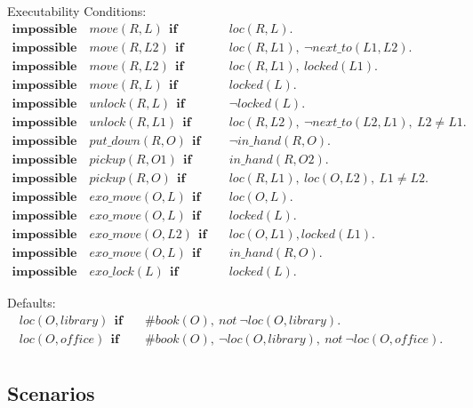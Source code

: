 \documentclass[11pt, oneside]{article}
\begin{document}
Executability Conditions:
\begin{align*}
  \mathbf{impossible}\quad move(R, L)~~\mathbf{if}&\quad loc(R,L).\\
  \mathbf{impossible}\quad move(R, L2)~~\mathbf{if}&\quad loc(R,L1),~\neg next\_to(L1,L2).\\
  \mathbf{impossible}\quad move(R,L2)~~\mathbf{if}&\quad loc(R,L1),~locked(L1).\\
  \mathbf{impossible}\quad move(R,L)~~\mathbf{if}&\quad locked(L).\\
  \mathbf{impossible}\quad unlock(R, L)~~\mathbf{if}&\quad \neg locked(L).\\
  \mathbf{impossible}\quad unlock(R, L1)~~\mathbf{if}&\quad loc(R,L2),~\neg next\_to(L2,L1),~L2\neq L1.\\
  \mathbf{impossible}\quad put\_down(R,O)~~\mathbf{if}&\quad \neg in\_hand(R,O).\\
  \mathbf{impossible}\quad pickup(R,O1)~~\mathbf{if}&\quad in\_hand(R,O2).\\
  \mathbf{impossible}\quad pickup(R,O)~~\mathbf{if}&\quad loc(R,L1),~loc(O,L2),~L1 \neq L2.\\
  \mathbf{impossible}\quad exo\_move(O,L)~~\mathbf{if}&\quad loc(O,L).\\
  \mathbf{impossible}\quad exo\_move(O,L)~~\mathbf{if}&\quad locked(L).\\
  \mathbf{impossible}\quad exo\_move(O,L2)~~\mathbf{if}&\quad loc(O,L1), locked(L1).\\
  \mathbf{impossible}\quad exo\_move(O,L)~~\mathbf{if}&\quad in\_hand(R,O).\\
  \mathbf{impossible}\quad exo\_lock(L)~~\mathbf{if}&\quad locked(L).
\end{align*}

Defaults:
\begin{align*}
  loc(O, library)~~\mathbf{if}&\quad \#book(O),~not~\neg loc(O, library).\\
  loc(O, office)~~\mathbf{if}&\quad \#book(O),~\neg loc(O, library),~not~\neg loc(O, office).\\
\end{align*}
	 			  				 			  	 			             


\subsection{Scenarios}
\end{document}
